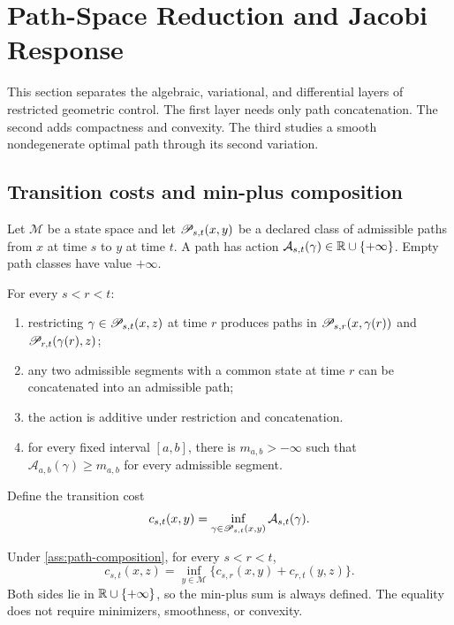 \section{Path-Space Reduction and Jacobi Response}
\label{sec:path-reduction}

This section separates the algebraic, variational, and differential layers of
restricted geometric control.  The first layer needs only path concatenation.
The second adds compactness and convexity.  The third studies a smooth
nondegenerate optimal path through its second variation.

\subsection{Transition costs and min-plus composition}

Let \(\mathcal M\) be a state space and let
\(\mathscr P_{s,t}(x,y)\) be a declared class of admissible paths from \(x\) at
time \(s\) to \(y\) at time \(t\).  A path has action
\(\mathcal A_{s,t}(\gamma)\in\mathbb R\cup\{+\infty\}\).  Empty path classes have
value \(+\infty\).

\begin{assumption}
\label{ass:path-composition}
For every \(s<r<t\):
\begin{enumerate}[leftmargin=*,itemsep=0.15em]
  \item restricting \(\gamma\in\mathscr P_{s,t}(x,z)\) at time \(r\) produces
  paths in \(\mathscr P_{s,r}(x,\gamma(r))\) and
  \(\mathscr P_{r,t}(\gamma(r),z)\);
  \item any two admissible segments with a common state at time \(r\) can be
  concatenated into an admissible path;
  \item the action is additive under restriction and concatenation.
  \item for every fixed interval \([a,b]\), there is
  \(m_{a,b}>-\infty\) such that
  \(\mathcal A_{a,b}(\gamma)\ge m_{a,b}\) for every admissible segment.
\end{enumerate}
\end{assumption}

Define the transition cost
\begin{equation*}
  c_{s,t}(x,y)
  =
  \inf_{\gamma\in\mathscr P_{s,t}(x,y)}\mathcal A_{s,t}(\gamma).
\end{equation*}

\begin{theorem}
\label{thm:path-dpp}
Under \cref{ass:path-composition}, for every \(s<r<t\),
\begin{equation}
  \boxed{
  c_{s,t}(x,z)
  =
  \inf_{y\in\mathcal M}
  \{c_{s,r}(x,y)+c_{r,t}(y,z)\}.}
  \tag{P1}
\end{equation}
Both sides lie in \(\mathbb R\cup\{+\infty\}\), so the min-plus sum is always
defined.  The equality does not require minimizers, smoothness, or convexity.
\end{theorem}

